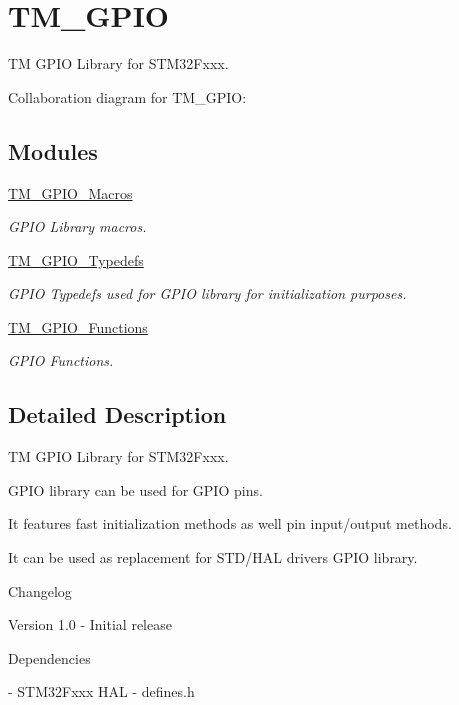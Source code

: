 \hypertarget{group___t_m___g_p_i_o}{}\section{T\+M\+\_\+\+G\+P\+IO}
\label{group___t_m___g_p_i_o}


TM G\+P\+IO Library for S\+T\+M32\+Fxxx.  


Collaboration diagram for T\+M\+\_\+\+G\+P\+IO\+:
\subsection*{Modules}
\begin{DoxyCompactItemize}
\item 
\hyperlink{group___t_m___g_p_i_o___macros}{T\+M\+\_\+\+G\+P\+I\+O\+\_\+\+Macros}
\begin{DoxyCompactList}\small\item\em G\+P\+IO Library macros. \end{DoxyCompactList}\item 
\hyperlink{group___t_m___g_p_i_o___typedefs}{T\+M\+\_\+\+G\+P\+I\+O\+\_\+\+Typedefs}
\begin{DoxyCompactList}\small\item\em G\+P\+IO Typedefs used for G\+P\+IO library for initialization purposes. \end{DoxyCompactList}\item 
\hyperlink{group___t_m___g_p_i_o___functions}{T\+M\+\_\+\+G\+P\+I\+O\+\_\+\+Functions}
\begin{DoxyCompactList}\small\item\em G\+P\+IO Functions. \end{DoxyCompactList}\end{DoxyCompactItemize}


\subsection{Detailed Description}
TM G\+P\+IO Library for S\+T\+M32\+Fxxx. 

G\+P\+IO library can be used for G\+P\+IO pins.

It features fast initialization methods as well pin input/output methods.

It can be used as replacement for S\+T\+D/\+H\+AL drivers G\+P\+IO library.

\begin{DoxyParagraph}{Changelog}

\end{DoxyParagraph}
\begin{DoxyVerb} Version 1.0
  - Initial release
\end{DoxyVerb}


\begin{DoxyParagraph}{Dependencies}

\end{DoxyParagraph}
\begin{DoxyVerb} - STM32Fxxx HAL
 - defines.h
\end{DoxyVerb}
 